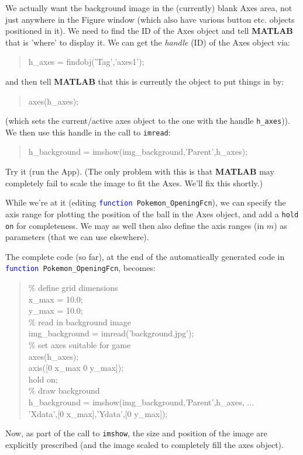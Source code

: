 \documentclass{tufte-book} %
\newenvironment{docspec}{\begin{quotation}\ttfamily\parskip0pt\parindent0pt\ignorespaces}{\end{quotation}}
\begin{document}
We actually want the background image in the (currently) blank \textsf{Axes} area, not just anywhere in the \textsf{Figure window} (which also have various button etc. objects positioned in it). We need to find the ID of the \textsf{Axes} object and tell \textbf{MATLAB} that is 'where' to display it. We can get the \textit{handle} (ID) of the \textsf{Axes} object via:
\begin{docspec}
h\_axes = findobj(\textcolor[rgb]{0.501961,0,1}{'Tag'},\textcolor[rgb]{0.501961,0,1}{'axes1'});
\end{docspec}
and then tell \textbf{MATLAB} that this is currently the object to put things in by:
\begin{docspec}
axes(h\_axes);
\end{docspec}
(which sets the current/active axes object to the one with the handle \texttt{h\_axes})).
We then use this handle in the call to \texttt{imread}:
\begin{docspec}
h\_background = imshow(img\_background,\textcolor[rgb]{0.501961,0,1}{'Parent'},h\_axes);
\end{docspec}
Try it (run the App). (The only problem with this is that \textbf{MATLAB} may completely fail to scale the image to fit the \textsf{Axes}. We'll fix this shortly.)

While we're at it (editing \texttt{\textcolor{blue}{function} Pokemon\_OpeningFcn}), we can specify the axis range for plotting the position of the ball in the Axes object, and add a \texttt{hold on} for completeness. We may as well then also define the axis ranges (in \(m\)) as parameters (that we can use elsewhere).

The complete code (so far), at the end of the automatically generated code in \texttt{\textcolor{blue}{function} Pokemon\_OpeningFcn}, becomes:
\begin{docspec}
\textcolor[rgb]{0,0.501961,0}{\% define grid dimensions}
\\x\_max = 10.0;
\\y\_max = 10.0;
\\\textcolor[rgb]{0,0.501961,0}{\% read in background image}
\\img\_background = imread(\textcolor[rgb]{0.501961,0,1}{'background.jpg'});
\\\textcolor[rgb]{0,0.501961,0}{\% set axes suitable for game}
\\axes(h\_axes);
\\axis([0 x\_max 0 y\_max]);
\\hold \textcolor[rgb]{0.501961,0,1}{on};
\\\textcolor[rgb]{0,0.501961,0}{\% draw background}
\\h\_background = imshow(img\_background,\textcolor[rgb]{0.501961,0,1}{'Parent'},h\_axes, ...
\\'Xdata',[0 x\_max],'Ydata',[0 y\_max]);
\end{docspec}
Now, as part of the call to \texttt{imshow}, the size and position of the image are explicitly prescribed (and the image scaled to completely fill the \textsf{axes} object).
\end{document}
